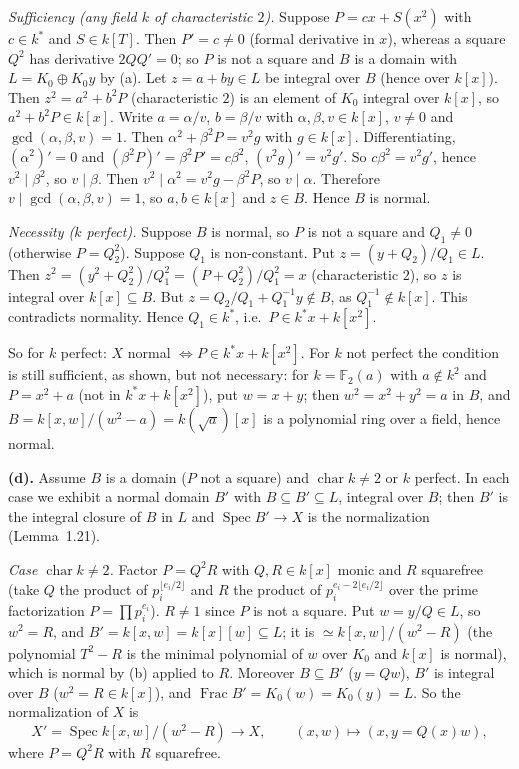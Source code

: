 \documentclass[11pt]{article}
\begin{document}
\emph{Sufficiency (any field $k$ of characteristic $2$).} Suppose $P=cx+S(x^2)$ with $c\in k^*$ and $S\in k[T]$. Then $P'=c\ne0$ (formal derivative in $x$), whereas a square $Q^2$ has derivative $2QQ'=0$; so $P$ is not a square and $B$ is a domain with $L=K_0\oplus K_0y$ by (a). Let $z=a+by\in L$ be integral over $B$ (hence over $k[x]$). Then $z^2=a^2+b^2P$ (characteristic $2$) is an element of $K_0$ integral over $k[x]$, so $a^2+b^2P\in k[x]$. Write $a=\alpha/v$, $b=\beta/v$ with $\alpha,\beta,v\in k[x]$, $v\neq0$ and $\gcd(\alpha,\beta,v)=1$. Then $\alpha^2+\beta^2P=v^2g$ with $g\in k[x]$. Differentiating, $(\alpha^2)'=0$ and $(\beta^2P)'=\beta^2P'=c\beta^2$, $(v^2g)'=v^2g'$. So $c\beta^2=v^2g'$, hence $v^2\mid\beta^2$, so $v\mid\beta$. Then $v^2\mid\alpha^2=v^2g-\beta^2P$, so $v\mid\alpha$. Therefore $v\mid\gcd(\alpha,\beta,v)=1$, so $a,b\in k[x]$ and $z\in B$. Hence $B$ is normal.

\emph{Necessity ($k$ perfect).} Suppose $B$ is normal, so $P$ is not a square and $Q_1\neq0$ (otherwise $P=Q_2^2$). Suppose $Q_1$ is non-constant. Put $z=(y+Q_2)/Q_1\in L$. Then $z^2=(y^2+Q_2^2)/Q_1^2=(P+Q_2^2)/Q_1^2=x$ (characteristic $2$), so $z$ is integral over $k[x]\subseteq B$. But $z=Q_2/Q_1+Q_1^{-1}y\notin B$, as $Q_1^{-1}\notin k[x]$. This contradicts normality. Hence $Q_1\in k^*$, i.e.\ $P\in k^*x+k[x^2]$.

So for $k$ perfect: $X$ normal $\iff P\in k^*x+k[x^2]$. For $k$ not perfect the condition is still sufficient, as shown, but not necessary: for $k=\mathbb F_2(a)$ with $a\notin k^2$ and $P=x^2+a$ (not in $k^*x+k[x^2]$), put $w=x+y$; then $w^2=x^2+y^2=a$ in $B$, and $B=k[x,w]/(w^2-a)=k(\sqrt a)[x]$ is a polynomial ring over a field, hence normal.

\textbf{(d).} Assume $B$ is a domain ($P$ not a square) and $\operatorname{char}k\ne2$ or $k$ perfect. In each case we exhibit a normal domain $B'$ with $B\subseteq B'\subseteq L$, integral over $B$; then $B'$ is the integral closure of $B$ in $L$ and $\operatorname{Spec}B'\to X$ is the normalization (Lemma~1.21).

\emph{Case $\operatorname{char}k\neq2$.} Factor $P=Q^2R$ with $Q,R\in k[x]$ monic and $R$ squarefree (take $Q$ the product of $p_i^{\lfloor e_i/2\rfloor}$ and $R$ the product of $p_i^{e_i-2\lfloor e_i/2\rfloor}$ over the prime factorization $P=\prod p_i^{e_i}$). $R\ne1$ since $P$ is not a square. Put $w=y/Q\in L$, so $w^2=R$, and $B'=k[x,w]=k[x][w]\subseteq L$; it is $\simeq k[x,w]/(w^2-R)$ (the polynomial $T^2-R$ is the minimal polynomial of $w$ over $K_0$ and $k[x]$ is normal), which is normal by (b) applied to $R$. Moreover $B\subseteq B'$ ($y=Qw$), $B'$ is integral over $B$ ($w^2=R\in k[x]$), and $\operatorname{Frac}B'=K_0(w)=K_0(y)=L$. So the normalization of $X$ is
\[ X'=\operatorname{Spec}k[x,w]/(w^2-R)\longrightarrow X,\qquad (x,w)\mapsto(x,y=Q(x)w),\]
where $P=Q^2R$ with $R$ squarefree.
\end{document}
